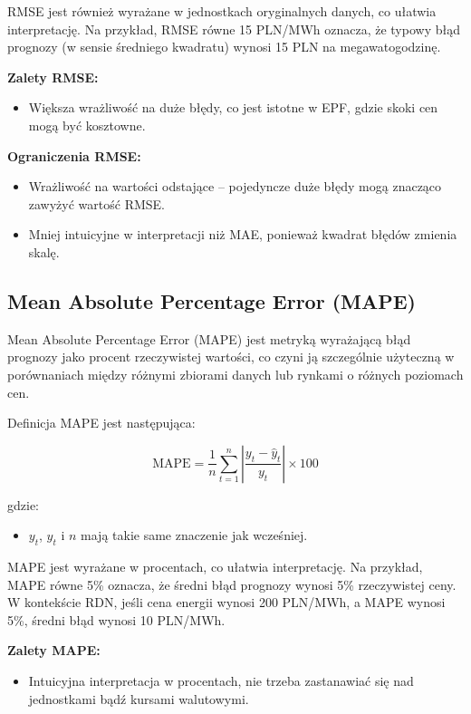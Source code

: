 RMSE jest również wyrażane w jednostkach oryginalnych danych, co ułatwia interpretację. Na przykład, RMSE równe 15 PLN/MWh oznacza, że typowy błąd prognozy (w sensie średniego kwadratu) wynosi 15 PLN na megawatogodzinę.

\textbf{Zalety RMSE:}
\begin{itemize}
    \item Większa wrażliwość na duże błędy, co jest istotne w EPF, gdzie skoki cen mogą być kosztowne.
\end{itemize}

\textbf{Ograniczenia RMSE:}
\begin{itemize}
    \item Wrażliwość na wartości odstające -- pojedyncze duże błędy mogą znacząco zawyżyć wartość RMSE.
    \item Mniej intuicyjne w interpretacji niż MAE, ponieważ kwadrat błędów zmienia skalę.
\end{itemize}

\subsection{Mean Absolute Percentage Error (MAPE)}
\label{subsec:mape}

Mean Absolute Percentage Error (MAPE) jest metryką wyrażającą błąd prognozy jako procent rzeczywistej wartości, co czyni ją szczególnie użyteczną w porównaniach między różnymi zbiorami danych lub rynkami o różnych poziomach cen.

Definicja MAPE jest następująca:

\[
\text{MAPE} = \frac{1}{n} \sum_{t=1}^{n} \left| \frac{y_t - \hat{y}_t}{y_t} \right| \times 100
\]

gdzie:
\begin{itemize}
    \item \( y_t \), \( \hat{y}_t \) i \( n \) mają takie same znaczenie jak wcześniej.
\end{itemize}

MAPE jest wyrażane w procentach, co ułatwia interpretację. Na przykład, MAPE równe 5\% oznacza, że średni błąd prognozy wynosi 5\% rzeczywistej ceny. W kontekście RDN, jeśli cena energii wynosi 200 PLN/MWh, a MAPE wynosi 5\%, średni błąd wynosi 10 PLN/MWh.

\textbf{Zalety MAPE:}
\begin{itemize}
    \item Intuicyjna interpretacja w procentach, nie trzeba zastanawiać się nad jednostkami bądź kursami walutowymi.
\end{itemize}

